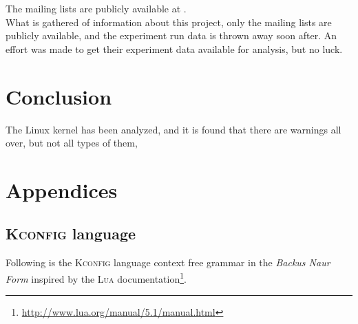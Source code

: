 \documentclass[a4paper,11pt]{report}
\newcommand{\f}{\footnote{\fn}}
\begin{document}
The mailing lists are publicly available at 
\cite{kbuildrobot,kbuildrobotall,kbuildlkp}.
\\

What is gathered of information about this project, only the mailing lists are 
publicly available, and the experiment run data is thrown away soon after. An 
effort was made to get their experiment data available for analysis, but no luck.

            \newpage
            \chapter{Conclusion}
The Linux kernel has been analyzed, and it is found that there are warnings all over, but not all types of them, 




\newpage




            \newpage
            \chapter{Appendices}


            \section{\textsc{Kconfig} language}
            \label{app:kconfig}

            \def \fn {\url{http://www.lua.org/manual/5.1/manual.html}}

Following is the \textsc{Kconfig} language context free grammar in the 
\emph{Backus Naur Form} inspired by the \textsc{Lua} documentation\f.
\end{document}
